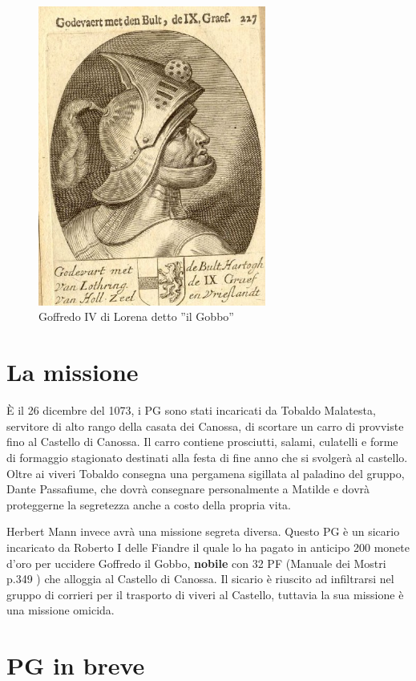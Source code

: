 \documentclass[letterpaper,twocolumn,openany,nodeprecatedcode]{dndbook}
\begin{document}
\begin{figure}
\centering
\includegraphics[width=7.5cm]{img/goffredo-il-gobbo.png}
    \caption{\textsf{Goffredo IV di Lorena detto ''il Gobbo''}}
    \label{fig:goffredo}
\end{figure}

\section{La missione}
È il 26 dicembre del 1073, i PG sono stati incaricati da Tobaldo Malatesta, servitore di alto rango della casata dei Canossa, di scortare un carro di provviste fino al Castello di Canossa. Il carro contiene prosciutti, salami, culatelli e forme di formaggio stagionato destinati alla festa di fine anno che si svolgerà al castello. Oltre ai viveri Tobaldo consegna una pergamena sigillata al paladino del gruppo, Dante Passafiume, che dovrà consegnare personalmente a Matilde e dovrà proteggerne la segretezza anche a costo della propria vita.

Herbert Mann invece avrà una missione segreta diversa. Questo PG è un sicario incaricato da Roberto I delle Fiandre il quale lo ha pagato in anticipo 200 monete d'oro per uccidere Goffredo il Gobbo, \textbf{nobile} con 32 PF (Manuale dei Mostri p.349 \cite{dnd:mostri}) che alloggia al Castello di Canossa. Il sicario è riuscito ad infiltrarsi nel gruppo di corrieri per il trasporto di viveri al Castello, tuttavia la sua missione è una missione omicida.


\section{PG in breve}\label{PG}
\end{document}
